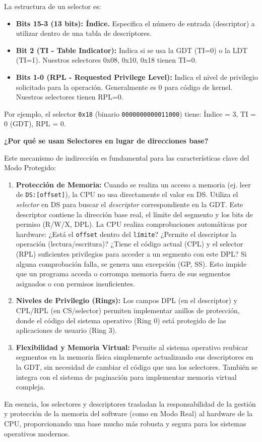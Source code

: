La estructura de un selector es:
\begin{itemize}[noitemsep]
    \item \textbf{Bits 15-3 (13 bits): Índice.} Especifica el número de entrada (descriptor) a utilizar dentro de una tabla de descriptores.
    \item \textbf{Bit 2 (TI - Table Indicator):} Indica si se usa la GDT (TI=0) o la LDT (TI=1). Nuestros selectores 0x08, 0x10, 0x18 tienen TI=0.
    \item \textbf{Bits 1-0 (RPL - Requested Privilege Level):} Indica el nivel de privilegio solicitado para la operación. Generalmente es 0 para código de kernel. Nuestros selectores tienen RPL=0.
\end{itemize}
Por ejemplo, el selector \texttt{0x18} (binario \texttt{0000000000011000}) tiene: Índice = 3, TI = 0 (GDT), RPL = 0.

\textbf{¿Por qué se usan Selectores en lugar de direcciones base?}

Este mecanismo de indirección es fundamental para las características clave del Modo Protegido:
\begin{enumerate}
    \item \textbf{Protección de Memoria:} Cuando se realiza un acceso a memoria (ej. leer de \texttt{DS:[offset]}), la CPU no usa directamente el valor en DS. Utiliza el \textit{selector} en DS para buscar el \textit{descriptor} correspondiente en la GDT. Este descriptor contiene la dirección base real, el límite del segmento y los bits de permiso (R/W/X, DPL). La CPU realiza comprobaciones automáticas por hardware: ¿Está el \texttt{offset} dentro del \texttt{límite}? ¿Permite el descriptor la operación (lectura/escritura)? ¿Tiene el código actual (CPL) y el selector (RPL) suficientes privilegios para acceder a un segmento con este DPL? Si alguna comprobación falla, se genera una excepción (GP, SS). Esto impide que un programa acceda o corrompa memoria fuera de sus segmentos asignados o con permisos insuficientes.
    \item \textbf{Niveles de Privilegio (Rings):} Los campos DPL (en el descriptor) y CPL/RPL (en CS/selector) permiten implementar anillos de protección, donde el código del sistema operativo (Ring 0) está protegido de las aplicaciones de usuario (Ring 3).
    \item \textbf{Flexibilidad y Memoria Virtual:} Permite al sistema operativo reubicar segmentos en la memoria física simplemente actualizando sus descriptores en la GDT, sin necesidad de cambiar el código que usa los selectores. También se integra con el sistema de paginación para implementar memoria virtual compleja.
\end{enumerate}
En esencia, los selectores y descriptores trasladan la responsabilidad de la gestión y protección de la memoria del software (como en Modo Real) al hardware de la CPU, proporcionando una base mucho más robusta y segura para los sistemas operativos modernos.


